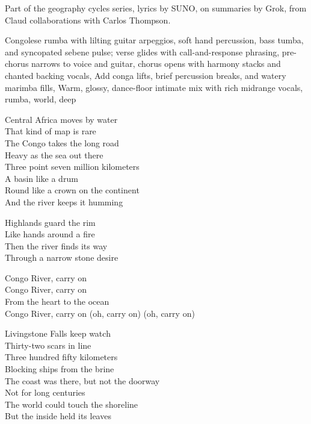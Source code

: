 
\begin{notes}
Part of the geography cycles series, lyrics by SUNO, on summaries by Grok, from Claud collaborations with Carlos Thompson.
\end{notes}
\begin{style}
Congolese rumba with lilting guitar arpeggios, soft hand percussion, bass tumba, and syncopated sebene pulse; verse glides with call-and-response phrasing, pre-chorus narrows to voice and guitar, chorus opens with harmony stacks and chanted backing vocals, Add conga lifts, brief percussion breaks, and watery marimba fills, Warm, glossy, dance-floor intimate mix with rich midrange vocals, rumba, world, deep
\end{style}
\begin{lyrics}
Central Africa moves by water\\
That kind of map is rare\\
The Congo takes the long road\\
Heavy as the sea out there\\
Three point seven million kilometers\\
A basin like a drum\\
Round like a crown on the continent\\
And the river keeps it humming

Highlands guard the rim\\
Like hands around a fire\\
Then the river finds its way\\
Through a narrow stone desire

Congo River, carry on\\
Congo River, carry on\\
From the heart to the ocean\\
Congo River, carry on
(oh, carry on)
(oh, carry on)

Livingstone Falls keep watch\\
Thirty-two scars in line\\
Three hundred fifty kilometers\\
Blocking ships from the brine\\
The coast was there, but not the doorway\\
Not for long centuries\\
The world could touch the shoreline\\
But the inside held its leaves


\end{lyrics}
